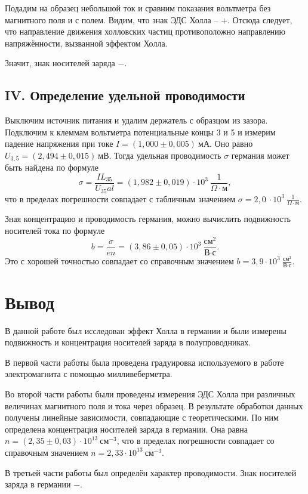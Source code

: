 \documentclass[a4paper,10pt]{article}
\begin{document}
Подадим на образец небольшой ток и сравним показания вольтметра без магнитного поля и с полем. Видим, что знак ЭДС Холла -- $+$. Отсюда следует, что направление движения холловских частиц противоположно направлению напряжённости, вызванной эффектом Холла.

Значит, знак носителей заряда $-$.

\subsection*{IV. Определение удельной проводимости}

Выключим источник питания и удалим держатель с образцом из зазора. Подключим к клеммам вольтметра потенциальные концы 3 и 5 и измерим падение напряжения при токе $I=\left(1,000\pm0,005\right)~\text{мА}$. Оно равно $U_{3,5}=\left(2,494\pm0,015\right)~\text{мВ}$. Тогда удельная проводимость $\sigma$ германия может быть найдена по формуле\[\sigma=\frac{IL_{35}}{U_{35}al}=\left(1,982\pm0,019\right)\cdot10^3~\frac{1}{\Omega\cdot\text{м}},\]что в пределах погрешности совпадает с табличным значением $\sigma=2,0~\cdot10^3~\frac{1}{\Omega\cdot\text{м}}$.

Зная концентрацию и проводимость германия, можно вычислить подвижность носителей тока по формуле\[b=\frac{\sigma}{en}=\left(3,86\pm0,05\right)\cdot10^3~\frac{\text{см}^2}{\text{В}\cdot\text{с}}.\]Это с хорошей точностью совпадает со справочным значением $b=3,9\cdot10^3~\frac{\text{см}^2}{\text{В}\cdot\text{с}}$.

\section*{Вывод}

В данной работе был исследован эффект Холла в германии и были измерены подвижность и концентрация носителей заряда в полупроводниках.

В первой части работы была проведена градуировка используемого в работе электромагнита с помощью милливеберметра.

Во второй части работы были проведены измерения ЭДС Холла при различных величинах магнитного поля и тока через образец. В результате обработки данных получены линейные зависимости, совпадающие с теоретическими. По ним определена концентрация носителей заряда в германии. Она равна $n=\left(2,35\pm0,03\right)\cdot10^{13}~\text{см}^{-3}$, что в пределах погрешности совпадает со справочным значением $n=2,33\cdot10^{13}~\text{см}^{-3}$.

В третьей части работы был определён характер проводимости. Знак носителей заряда в германии $-$.
\end{document}
